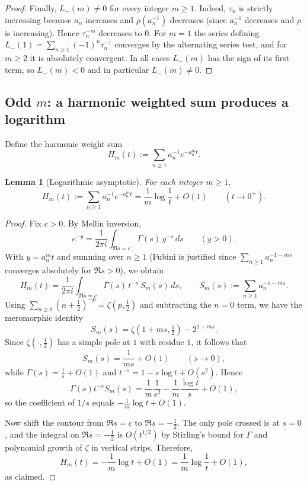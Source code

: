 \documentclass[11pt,letterpaper]{amsart}
\numberwithin{equation}{section}
\newtheorem{lemma}[theorem]{Lemma}
\theoremstyle{definition}
\begin{document}
\begin{proof}
Finally, $L_-(m)\neq0$ for every integer $m\ge1$.
Indeed, $\tau_n$ is strictly increasing because $a_n$ increases and $\rho(a_n^{-1})$
decreases (since $a_n^{-1}$ decreases and $\rho$ is increasing).
Hence $\tau_n^{-m}$ decreases to $0$.
For $m=1$ the series defining $L_-(1)=\sum_{n\ge1}(-1)^n\tau_n^{-1}$ converges by the alternating
series test, and for $m\ge2$ it is absolutely convergent.
In all cases $L_-(m)$ has the sign of its first term, so $L_-(m)<0$ and in particular $L_-(m)\neq0$.

\end{proof}


\subsection{Odd $m$: a harmonic weighted sum produces a logarithm}

Define the harmonic weight sum
\[
H_m(t):=\sum_{n\ge1}a_n^{-1}e^{-a_n^m t}.
\]

\begin{lemma}[Logarithmic asymptotic]\label{lem:Hm-log}
For each integer $m\ge1$,
\[
H_m(t):=\sum_{n\ge1}a_n^{-1}e^{-a_n^m t}
=\frac{1}{m}\log\frac{1}{t}+O(1)\qquad(t\to0^+).
\]
\end{lemma}

\begin{proof}
Fix $c>0$. By Mellin inversion,
\[
e^{-y}=\frac{1}{2\pi i}\int_{\Re s=c}\Gamma(s)\,y^{-s}\,ds\qquad(y>0).
\]
With $y=a_n^m t$ and summing over $n\ge1$ (Fubini is justified since $\sum_{n\ge1}a_n^{-1-ms}$
converges absolutely for $\Re s>0$), we obtain
\[
H_m(t)=\frac{1}{2\pi i}\int_{\Re s=c}\Gamma(s)\,t^{-s}\,S_m(s)\,ds,
\qquad
S_m(s):=\sum_{n\ge1}a_n^{-1-ms}.
\]
Using $\sum_{n\ge0}(n+\tfrac12)^{-p}=\zeta(p,\tfrac12)$ and subtracting the $n=0$ term,
we have the meromorphic identity
\[
S_m(s)=\zeta(1+ms,\tfrac12)-2^{1+ms}.
\]
Since $\zeta(\cdot,\tfrac12)$ has a simple pole at $1$ with residue $1$, it follows that
\[
S_m(s)=\frac{1}{ms}+O(1)\qquad(s\to0),
\]
while $\Gamma(s)=\frac1s+O(1)$ and $t^{-s}=1-s\log t+O(s^2)$. Hence
\[
\Gamma(s)t^{-s}S_m(s)=\frac{1}{m}\frac{1}{s^2}-\frac{1}{m}\frac{\log t}{s}+O(1),
\]
so the coefficient of $1/s$ equals $-\frac{1}{m}\log t+O(1)$.

Now shift the contour from $\Re s=c$ to $\Re s=-\tfrac12$. The only pole crossed is at $s=0$,
and the integral on $\Re s=-\tfrac12$ is $O(t^{1/2})$ by Stirling's bound for $\Gamma$
and polynomial growth of $\zeta$ in vertical strips. Therefore,
\[
H_m(t)= -\frac{1}{m}\log t + O(1)=\frac{1}{m}\log\frac{1}{t}+O(1),
\]
as claimed.
\end{proof}
\end{document}
